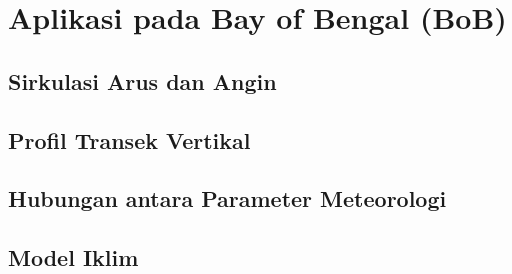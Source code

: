 \vspace{1.5pc}
\section[Aplikasi pada Bay of Bengal (BoB)]{Aplikasi pada Bay of Bengal (BoB)}
\begin{spacing}{1.5}
\vspace{-1pc}
\subsection[Sirkulasi Arus dan Angin]{Sirkulasi Arus dan Angin}
	
	\lipsum[1]

\subsection[Profil Transek Vertikal]{Profil Transek Vertikal}
	
	\lipsum[1]
	
\subsection[Hubungan antara Parameter Meteorologi]{Hubungan antara Parameter Meteorologi}
	
	\lipsum[1]
	

\subsection[Model Iklim]{Model Iklim}
	
	\lipsum[1]
	
\end{spacing}

